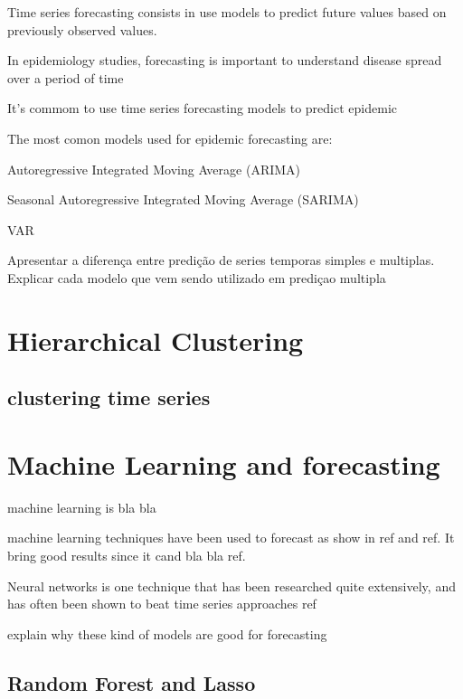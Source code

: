 \documentclass[12pt]{report}
\begin{document}
Time series forecasting consists in use models to predict future values based on previously observed values.
 
 
In epidemiology studies, forecasting is important to understand disease spread over a period of time

It's commom to use time series forecasting models to predict epidemic
 
The most comon models used for epidemic forecasting are:
 
 \begin{description}
  \item Autoregressive Integrated Moving Average (ARIMA)
  \item Seasonal Autoregressive Integrated Moving Average (SARIMA)
  \item VAR
 \end{description}

Apresentar a diferença entre predição de series temporas simples e multiplas. Explicar cada modelo que vem sendo utilizado em prediçao multipla


\section{Hierarchical Clustering}
\subsection{clustering time series}

\section{Machine Learning and forecasting}

machine learning is bla bla

machine learning techniques have been used to forecast as show in ref and ref. It bring good results since
it cand bla bla ref.

Neural networks is one technique that has been researched quite 
extensively, and has often been shown to beat time series approaches ref 

explain why these kind of models are good for forecasting

\subsection{Random Forest and Lasso}
\end{document}
